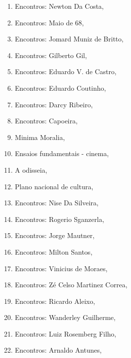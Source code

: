 \begin{multicols}{2}
\begin{enumerate}
\setlength\parskip{8pt}
\setlength\itemsep{-1.4mm}
\item Encontros: Newton Da Costa, {}
\item Encontros: Maio de 68, {}
\item Encontros: Jomard Muniz de Britto, {}
\item Encontros: Gilberto Gil, {}
\item Encontros: Eduardo V. de Castro, {}
\item Encontros: Eduardo Coutinho, {}
\item Encontros: Darcy Ribeiro, {}
\item Encontros: Capoeira, {}
\item Minima Moralia, {}
\item Ensaios fundamentais - cinema, {}
\item A odisseia, {}
\item Plano nacional de cultura, {}
\item Encontros: Nise Da Silveira, {}
\item Encontros: Rogerio Sganzerla, {}
\item Encontros: Jorge Mautner, {}
\item Encontros: Milton Santos, {}
\item Encontros: Vinicius de Moraes, {}
\item Encontros: Zé Celso Martinez Correa, {}
\item Encontros: Ricardo Aleixo, {}
\item Encontros: Wanderley Guilherme, {}
\item Encontros: Luiz Rosemberg Filho, {}
\item Encontros: Arnaldo Antunes, {}

\end{enumerate}
\end{multicols}
